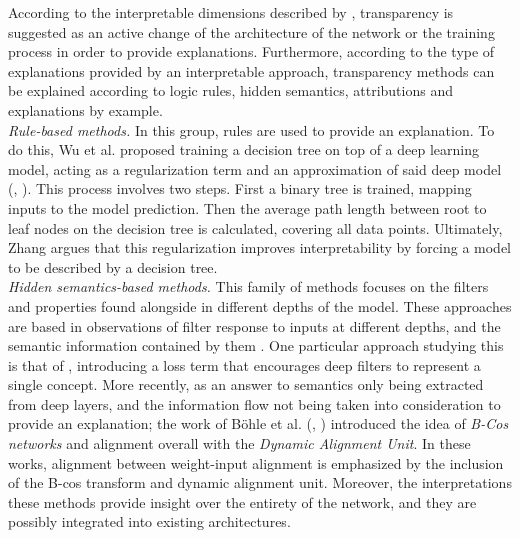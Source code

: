 \noindent According to the interpretable dimensions described by \autocite{zhang2021survey}, 
transparency is suggested as an active change of the architecture of the network or the training 
process in order to provide explanations. Furthermore, according to the type of explanations 
provided by an interpretable approach, transparency methods can be explained according to logic 
rules, hidden semantics, attributions and explanations by example.\\

\noindent \emph{Rule-based methods.} In this group, rules are used to provide an explanation. 
To do this, Wu et al. proposed training a decision tree on top of a deep learning model, acting as 
a regularization term and an approximation of said deep model (\cite{wu2018beyond}, 
\cite{wu2020regional}). This process involves two steps. First a binary tree is trained, mapping 
inputs to the model prediction. Then the average path length between root to leaf nodes on the 
decision tree is calculated, covering all data points. Ultimately, Zhang 
argues that this regularization improves interpretability by forcing a model to be described by a 
decision tree.\\

\noindent \emph{Hidden semantics-based methods.} This family of methods focuses on the filters 
and properties found alongside in different depths of the model. These approaches are based in 
observations of filter response to inputs at different depths, and the semantic information 
contained by them \autocite{zhou2018interpreting}. 
One particular approach studying this is that of \autocite{zhang2018interpretable}, introducing a 
loss term that encourages deep filters to represent a single concept. More recently, as an answer to 
semantics only being extracted from deep layers, and the information flow not being taken into 
consideration to provide an explanation; the work of B\"ohle et al. (\cite{bohle2022b}, 
\cite{bohle2024b}) introduced the idea of \emph{B-Cos networks} and alignment overall with the 
\emph{Dynamic Alignment Unit}. In these works, alignment between weight-input alignment is 
emphasized by the inclusion of the B-cos transform and dynamic alignment unit. Moreover, the 
interpretations these methods provide insight over the entirety of the network, and they are 
possibly integrated into existing architectures.\\

